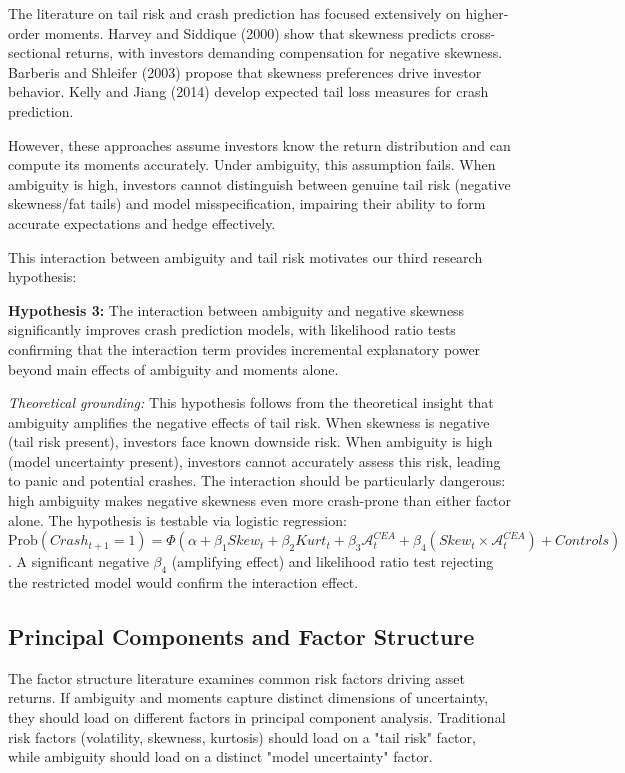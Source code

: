 \documentclass[preprint,12pt,authoryear]{elsarticle}
\begin{document}
The literature on tail risk and crash prediction has focused extensively on higher-order moments. Harvey and Siddique (2000) show that skewness predicts cross-sectional returns, with investors demanding compensation for negative skewness. Barberis and Shleifer (2003) propose that skewness preferences drive investor behavior. Kelly and Jiang (2014) develop expected tail loss measures for crash prediction.

However, these approaches assume investors know the return distribution and can compute its moments accurately. Under ambiguity, this assumption fails. When ambiguity is high, investors cannot distinguish between genuine tail risk (negative skewness/fat tails) and model misspecification, impairing their ability to form accurate expectations and hedge effectively.

This interaction between ambiguity and tail risk motivates our third research hypothesis:

\begin{center}
\textbf{Hypothesis 3:} The interaction between ambiguity and negative skewness significantly improves crash prediction models, with likelihood ratio tests confirming that the interaction term provides incremental explanatory power beyond main effects of ambiguity and moments alone.
\end{center}

\noindent
\textit{Theoretical grounding:} This hypothesis follows from the theoretical insight that ambiguity amplifies the negative effects of tail risk. When skewness is negative (tail risk present), investors face known downside risk. When ambiguity is high (model uncertainty present), investors cannot accurately assess this risk, leading to panic and potential crashes. The interaction should be particularly dangerous: high ambiguity makes negative skewness even more crash-prone than either factor alone. The hypothesis is testable via logistic regression: $\text{Prob}(Crash_{t+1}=1) = \Phi(\alpha + \beta_1 Skew_t + \beta_2 Kurt_t + \beta_3 \mathcal{A}^{CEA}_t + \beta_4 (Skew_t \times \mathcal{A}^{CEA}_t) + Controls)$. A significant negative $\beta_4$ (amplifying effect) and likelihood ratio test rejecting the restricted model would confirm the interaction effect.

\subsection{Principal Components and Factor Structure}

The factor structure literature examines common risk factors driving asset returns. If ambiguity and moments capture distinct dimensions of uncertainty, they should load on different factors in principal component analysis. Traditional risk factors (volatility, skewness, kurtosis) should load on a "tail risk" factor, while ambiguity should load on a distinct "model uncertainty" factor.
\end{document}

